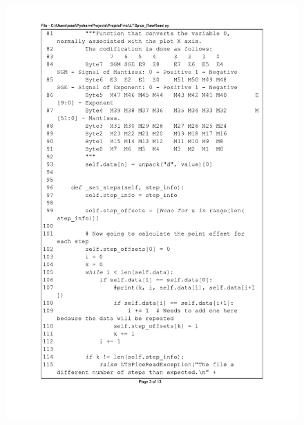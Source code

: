 \begin{figure}[H]
\centering
\includegraphics[scale=0.9]{01_Pre_textuais/code/leitura3.pdf}
\end{figure}
